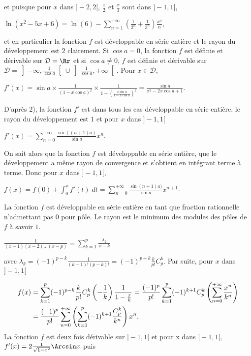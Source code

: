 {{et puisque pour $x$ dans $]-2,2[$, $\frac{x}{2}$ et $\frac{x}{3}$ sont dans $]-1,1[$, 

\begin{center}
$\ln(x^2-5x+6)=\ln(6)-\sum_{n=1}^{+\infty}\left(\frac{1}{2^n}+\frac {1}{3^n}\right)\frac{x^n}{n}$,
\end{center}

et en particulier la fonction $f$ est développable en série entière et le rayon du développement est $2$ clairement.
Si $\cos a = 0$, la fonction $f$ est définie et dérivable sur $\mathcal{D}=\Rr$ et si $\cos a\neq 0$, $f$ est définie et dérivable sur $\mathcal{D}=\left]-\infty,\frac{1}{\cos a}\right[\cup\left]\frac{1}{\cos a},+\infty\right[$. Pour $x\in\mathcal{D}$, 

\begin{center}
$f'(x) =\sin a\times\frac{1}{(1-x\cos a)^2}\times\frac{1}{1+\left(\frac{x\sin a}{1-x\cos a}\right)^2}=\frac{\sin a}{x^2-2x\cos a+1}$.
\end{center}

D'après 2), la fonction $f'$ est dans tous les cas développable en série entière, le rayon du développement est $1$ et pour $x$ dans $]-1,1[$

\begin{center}
$f'(x) =\sum_{n=0}^{+\infty}\frac{\sin((n+1)a)}{\sin a}x^n$.
\end{center}

On sait alors que la fonction $f$ est développable en série entière, que le développement a même rayon de convergence et s'obtient en intégrant terme à terme. Donc pour $x$ dans $]-1,1[$,

\begin{center}
$f(x)= f(0)+\int_{0}^{x}f'(t)\;dt=\sum_{n=0}^{+\infty}\frac{\sin(n+1)a)}{\sin a}x^{n+1}$.
\end{center}
La fonction $f$ est développable en série entière en tant que fraction rationnelle n'admettant pas $0$ pour pôle. Le rayon est le minimum des modules des pôles de $f$ à savoir $1$.

\begin{center}
$\frac{1}{(x-1)(x-2)\ldots(x-p)}=\sum_{k=1}^{p}\frac{\lambda_k}{x-k}$
\end{center}

avec $\lambda_k=(-1)^{p-k}\frac{1}{(k-1)!(p-k)!}= (-1)^{p-k}\frac{k}{p!}C_p^k$.
Par suite, pour $x$ dans $]-1,1[$

\begin{align*}\ensuremath
f(x)&=\sum_{k=1}^{p}(-1)^{p-k}\frac{k}{p!}C_p^k\left(-\frac{1}{k}\right)\frac{1}{1-\frac{x}{k}}=\frac{(-1)^p}{p!}\sum_{k=1}^{p} (-1)^{k+1}C_p^k\left(\sum_{n=0}^{+\infty}\frac{x^n}{k^n}\right)\\
 &=\frac{(-1)^p}{p!}\sum_{n=0}^{+\infty}\left(\sum_{k=1}^{p}(-1)^{k+1}\frac{C_p^k}{k^n}\right)x^n.
\end{align*}
La fonction $f$ est deux fois dérivable sur $]-1,1[$ et pour x dans $]-1,1[$, $f'(x) =2\frac{1}{\sqrt{1-x^2}}\Arcsin x$ puis

}}
